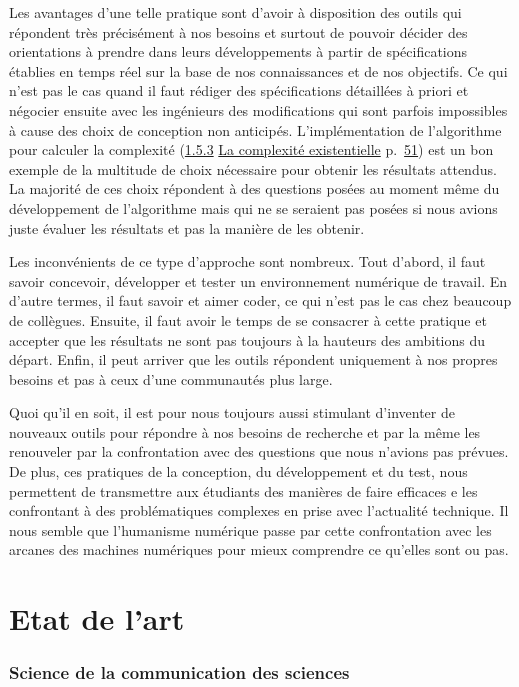 \documentclass[
  letterpaper,
  DIV=11,
  numbers=noendperiod]{scrreprt}
\begin{document}
Les avantages d'une telle pratique sont d'avoir à disposition des outils
qui répondent très précisément à nos besoins et surtout de pouvoir
décider des orientations à prendre dans leurs développements à partir de
spécifications établies en temps réel sur la base de nos connaissances
et de nos objectifs. Ce qui n'est pas le cas quand il faut rédiger des
spécifications détaillées à priori et négocier ensuite avec les
ingénieurs des modifications qui sont parfois impossibles à cause des
choix de conception non anticipés. L'implémentation de l'algorithme pour
calculer la complexité (\protect\hyperlink{anchor-19}{1.5.3}
\protect\hyperlink{anchor-19}{La complexité existentielle}
p.~\protect\hyperlink{anchor-19}{51}) est un bon exemple de la multitude
de choix nécessaire pour obtenir les résultats attendus. La majorité de
ces choix répondent à des questions posées au moment même du
développement de l'algorithme mais qui ne se seraient pas posées si nous
avions juste évaluer les résultats et pas la manière de les obtenir.

Les inconvénients de ce type d'approche sont nombreux. Tout d'abord, il
faut savoir concevoir, développer et tester un environnement numérique
de travail. En d'autre termes, il faut savoir et aimer coder, ce qui
n'est pas le cas chez beaucoup de collègues. Ensuite, il faut avoir le
temps de se consacrer à cette pratique et accepter que les résultats ne
sont pas toujours à la hauteurs des ambitions du départ. Enfin, il peut
arriver que les outils répondent uniquement à nos propres besoins et pas
à ceux d'une communautés plus large.

Quoi qu'il en soit, il est pour nous toujours aussi stimulant d'inventer
de nouveaux outils pour répondre à nos besoins de recherche et par la
même les renouveler par la confrontation avec des questions que nous
n'avions pas prévues. De plus, ces pratiques de la conception, du
développement et du test, nous permettent de transmettre aux étudiants
des manières de faire efficaces e les confrontant à des problématiques
complexes en prise avec l'actualité technique. Il nous semble que
l'humanisme numérique passe par cette confrontation avec les arcanes des
machines numériques pour mieux comprendre ce qu'elles sont ou pas.

\hypertarget{sec-etatArtTI}{%
\chapter{Etat de l'art}\label{sec-etatArtTI}}

\hypertarget{science-de-la-communication-des-sciences}{%
\subsection{Science de la communication des
sciences}\label{science-de-la-communication-des-sciences}}
\end{document}
